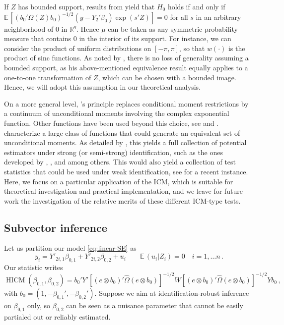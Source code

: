 \documentclass[12pt]{article}
\newcommand{\E}{\operatorname{E}}
\newcommand{\1}{\mathbf{1}}
\newcommand{\HICM}{\operatorname{HICM}}
\def\E{\mathbb{E}\,}
\begin{document}
If $Z$ has bounded support, results from \cite{Bierens82}  yield
that ${H}_{0}$ holds if and only if
$
\E \left[ (b_0' \Omega(Z) b_0)^{-1/2} \left( y - Y_{2}'\beta_0 \right)
\exp(s'Z) \right] = 0
$
for all $s$ in an arbitrary neighborhood of $0$ in
$\mathbb{R}^q$. Hence $\mu$ can be taken as any symmetric probability
measure that contains $0$ in the interior of its support. For
instance, we can consider the product of uniform distributions on
$[-\pi,\pi]$, so that $w(\cdot)$ is the product of sinc functions.  As
noted by \cite{Bierens82}, there is no loss of generality assuming a
bounded support, as his above-mentioned equivalence result equally
applies to a one-to-one transformation of $Z$, which can be chosen
with a bounded image. Hence, we will adopt this assumption in our
theoretical analysis.


On a more general level, \cite{Bierens82}'s principle replaces
conditional moment restrictions by a continuum of unconditional
moments involving the complex exponential function. Other functions
have been used beyond this choice, see
\cite{Bierens90} and \cite{BP97}. \cite{stinchcombe_white_1998}
characterize  a large class of functions that could
generate an equivalent set of unconditional moments. As detailed by
\cite{LP2013}, this yields a full collection of potential estimators
under strong (or semi-strong) identification, such as the ones developed
by \cite{dominguez_consistent_2004}, \cite{AntoineLavergne}, and
\cite{escanciano_simple_2018} among others. This would also yield a
collection of test statistics that could be used under weak
identification, see \cite{Chen2025} for a recent instance.
Here, we focus on a particular application of the ICM, which is suitable for
theoretical investigation and practical implementation, and we leave
for future work the investigation of the relative merits of these
different ICM-type tests.

\subsection{Subvector inference} \label{subs:subvector}

Let us partition our model \eqref{eq:linear-SE} as
\begin{equation}
y_{i} = Y'_{2i,1} \beta_{0,1} + Y'_{2i,2} \beta_{0,2} +  u_{i} \qquad \E (u_{i} |
Z_{i}) = 0 \quad i=1, \ldots n
\, .
\label{eq:model3}
\end{equation}
Our statistic writes
\[
 \HICM(\beta_{0,1},\beta_{0,2}) = b_{0}' Y'
\left[ (e \otimes b_0 )'  \widehat{\Omega}  (e \otimes b_0 ) \right]^{-1/2}   W
\left[ (e \otimes b_0 )'  \widehat{\Omega}  (e \otimes b_0 ) \right]^{-1/2}
Y b_{0}
\, ,
\]
with $b_0=(1, -\beta_{0,1}',-\beta_{0,2}')$.  Suppose we aim at
identification-robust inference on $\beta_{0,1}$ only, so $\beta_{0,2}$ can
be seen as a nuisance parameter that cannot be easily partialed out or
reliably estimated.
\end{document}
